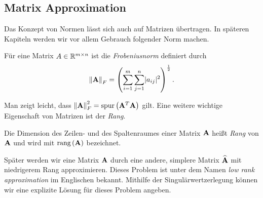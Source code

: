 \subsection{Matrix Approximation}

Das Konzept von Normen lässt sich auch auf Matrizen übertragen. In späteren Kapiteln werden wir vor allem Gebrauch folgender Norm machen.

\begin{defn}
Für eine Matrix $A \in \mathbb{R}^{m \times n}$ ist die \textit{Frobeniusnorm} definiert durch
$$\left\lVert \mathbf{A} \right\rVert_F = \left( \sum_{i=1}^{m} \sum_{j=1}^{n} \lvert a_{ij} \rvert ^{2} \right) ^{\frac{1}{2}}.$$
\end{defn}

Man zeigt leicht, dass $\left\lVert \mathbf{A} \right\rVert_F^2 = \text{spur} \left( \mathbf{A}^T \mathbf{A} \right)$ gilt.
Eine weitere wichtige Eigenschaft von Matrizen ist der \textit{Rang}.

\begin{defn}
Die Dimension des Zeilen- und des Spaltenraumes einer Matrix $\mathbf{A}$ heißt \textit{Rang} von $\mathbf{A}$ und wird mit $\text{rang} \left( \mathbf{A} \right)$ bezeichnet.
\end{defn}

Später werden wir eine Matrix $\mathbf{A}$ durch eine andere, simplere Matrix $\widehat{\mathbf{A}}$ mit niedrigerem Rang approximieren. Dieses Problem ist unter dem Namen \textit{low rank approximation} im Englischen bekannt.
Mithilfe der Singulärwertzerlegung können wir eine explizite Lösung für dieses Problem angeben.

